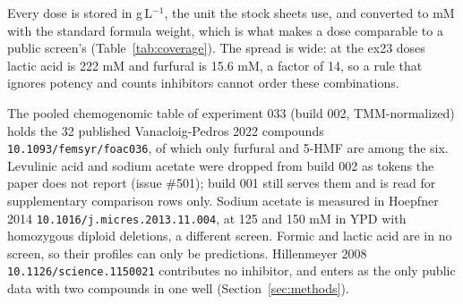 \begin{table}[htbp]
\centering
\footnotesize
\caption[]{The 63 ex23 combinations under the two growth calls. A combination grew when at
least one of its three wells grew; the mean fitness is over the combinations that grew,
each on its own call's scale. The software call reproduces the counts of experiment 039
exactly, which places the difference in the call rather than in the table.}
\label{tab:growthcall}

\end{table}

 Every dose is stored in g\,L$^{-1}$, the unit the stock sheets use, and
converted to mM with the standard formula weight, which is what makes a dose comparable
to a public screen's (Table~\ref{tab:coverage}). The spread is wide: at the ex23 doses
lactic acid is 222 mM and furfural is 15.6 mM, a factor of 14, so a rule that ignores
potency and counts inhibitors cannot order these combinations.

 The pooled
chemogenomic table of experiment 033 (build 002, TMM-normalized) holds the 32 published
Vanacloig-Pedros 2022 compounds \texttt{10.1093/femsyr/foac036}, of which only furfural
and 5-HMF are among the six. Levulinic acid and sodium acetate were dropped from build
002 as tokens the paper does not report (issue \#501); build 001 still serves them and
is read for supplementary comparison rows only. Sodium acetate is measured in Hoepfner
2014 \texttt{10.1016/j.micres.2013.11.004}, at 125 and 150 mM in YPD with homozygous
diploid deletions, a different screen. Formic and lactic acid are in no screen, so their
profiles can only be predictions. Hillenmeyer 2008
\texttt{10.1126/science.1150021} contributes no inhibitor, and enters as the only public
data with two compounds in one well (Section~\ref{sec:methods}).

\begin{table}[htbp]
\centering
\scriptsize
\caption[]{The six inhibitors: dose at ex23, public coverage, and the profile the
best-available matrix uses for each. Replicate reliability is the Spearman correlation
between the screen's own replicate profiles, and the column is blank where the source
screen gives no replicate pair. Acetic acid is matched to Hoepfner's sodium acetate,
the same anion at YPD pH, which is a stated assumption and not a measurement; 5-HMF is
measured but its reliability is below zero, so the matrix uses its prediction instead.}
\label{tab:coverage}

\end{table}


